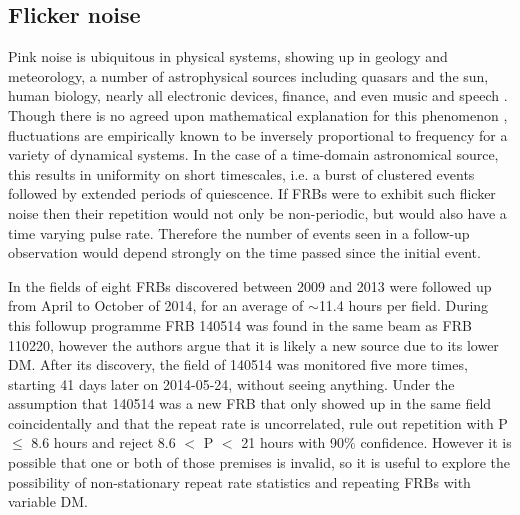 \documentclass[useAMS,usenatbib]{mn2e}
\begin{document}
\subsection{Flicker noise}

Pink noise is ubiquitous in physical systems, showing up in 
geology and meteorology, a number 
of astrophysical sources including quasars and the sun, 
human biology, nearly all electronic devices, finance, 
and even music and speech
\citep{1978ComAp...7..103P, 1975Natur.258..317V}.
Though there is no agreed upon
mathematical explanation for this phenomenon
 \citep{2002physics...4033M}, fluctuations 
are empirically known to be inversely proportional to frequency 
for a variety of dynamical systems.
In the case of a time-domain astronomical 
source, this results in uniformity on short timescales, i.e. a burst of 
clustered events followed by extended periods of quiescence. 
If FRBs were to exhibit such flicker noise then their repetition would 
not only be non-periodic, but would also have a time varying 
pulse rate. Therefore the number of events
seen in a follow-up observation would depend strongly on 
the time passed since the initial event.

In \cite{2015MNRAS.454..457P}
the fields of eight FRBs discovered between 2009 and 2013
were followed up from April to October of 2014, for an average 
of $\sim$11.4 hours per field. During this followup programme 
FRB 140514 was found in the same beam as FRB 110220, however
the authors argue that it is likely a new source due to its lower DM. 
After its discovery, the field of 140514 was monitored 
five more times, starting 41 days later on 2014-05-24, without seeing anything.
Under the assumption that 140514 was a new FRB 
that only showed up in the same field 
coincidentally and that the repeat rate is uncorrelated,
 \cite{2015MNRAS.454..457P} rule out repetition with P $\le$ 8.6 
hours and reject 8.6 $<$ P $<$ 21 hours with 90$\%$ confidence.
However it is possible that one or both of those premises 
is invalid, so it is useful to explore the possibility of non-stationary 
repeat rate statistics and repeating FRBs with variable DM. 
\end{document}
